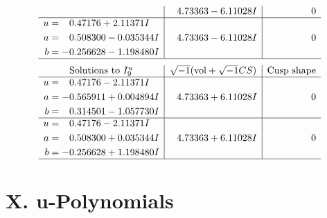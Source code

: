 \documentclass[1p]{elsarticle_modified}
\theoremstyle{definition}
\newcommand{\I}{\sqrt{-1}}
\begin{document}
$$\begin{array}{c|c|c}
 & \phantom{-}4.73363 - 6.11028 I & \phantom{-0.000000 } 0 \\ \hline\begin{aligned}
u &= \phantom{-}0.47176 + 2.11371 I \\
a &= \phantom{-}0.508300 - 0.035344 I \\
b &= -0.256628 - 1.198480 I\end{aligned}
 & \phantom{-}4.73363 - 6.11028 I & \phantom{-0.000000 } 0\\
 \hline 
 \end{array}$$\newpage$$\begin{array}{c|c|c}  
\text{Solutions to }I^u_{9}& \I (\text{vol} + \sqrt{-1}CS) & \text{Cusp shape}\\
 \hline 
\begin{aligned}
u &= \phantom{-}0.47176 - 2.11371 I \\
a &= -0.565911 + 0.004894 I \\
b &= \phantom{-}0.314501 - 1.057730 I\end{aligned}
 & \phantom{-}4.73363 + 6.11028 I & \phantom{-0.000000 } 0 \\ \hline\begin{aligned}
u &= \phantom{-}0.47176 - 2.11371 I \\
a &= \phantom{-}0.508300 + 0.035344 I \\
b &= -0.256628 + 1.198480 I\end{aligned}
 & \phantom{-}4.73363 + 6.11028 I & \phantom{-0.000000 } 0\\
 \hline 
 \end{array}$$\newpage
\newpage\renewcommand{\arraystretch}{1}
\centering \section*{ X. u-Polynomials}
\end{document}
